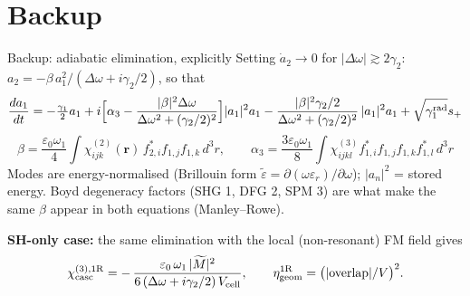 \documentclass[aspectratio=169,10pt]{beamer}
\newcommand{\Dom}{\Delta\omega}
\newcommand{\gtwo}{\gamma_2}
\newcommand{\gone}{\gamma_1}
\begin{document}
\appendix
\section*{Backup}

\begin{frame}{Backup: adiabatic elimination, explicitly}
  Setting $\dot a_2 \to 0$ for $|\Dom| \gtrsim 2\gtwo$: \quad
  $a_2 = -\beta\,a_1^2/(\Dom + i\gtwo/2)$, so that
  \[
    \frac{da_1}{dt} = -\tfrac{\gone}{2}a_1
      + i\Bigl[\alpha_3 - \frac{|\beta|^2\Dom}{\Dom^2+(\gtwo/2)^2}\Bigr]|a_1|^2a_1
      - \frac{|\beta|^2\gtwo/2}{\Dom^2+(\gtwo/2)^2}\,|a_1|^2a_1 + \sqrt{\gamma_1^{\rm rad}}s_+
  \]
  \[
    \beta = \frac{\varepsilon_0\omega_1}{4}\int \chi^{(2)}_{ijk}(\mathbf r)\,
            f^{*}_{2,i}f_{1,j}f_{1,k}\,d^3r,
    \qquad
    \alpha_3 = \frac{3\varepsilon_0\omega_1}{8}\int \chi^{(3)}_{ijkl}
            f^{*}_{1,i}f_{1,j}f_{1,k}f^{*}_{1,l}\,d^3r
  \]
  Modes are energy-normalised (Brillouin form
  $\widetilde\varepsilon = \partial(\omega\varepsilon_r)/\partial\omega$); $|a_n|^2$ =
  stored energy. Boyd degeneracy factors (SHG 1, DFG 2, SPM 3) are what make the same
  $\beta$ appear in both equations (Manley--Rowe).

  \vspace{4pt}
  \textbf{SH-only case:} the same elimination with the local (non-resonant) FM field gives
  \[
    \chi^{(3),{\rm 1R}}_{\rm casc}
      = -\,\frac{\varepsilon_0\,\omega_1\,|\widetilde M|^2}
                {6\,(\Dom+i\gtwo/2)\,V_{\rm cell}},
    \qquad \eta_{\rm geom}^{\rm 1R} = \bigl(|{\rm overlap}|/V\bigr)^2 .
  \]
\end{frame}
\end{document}
